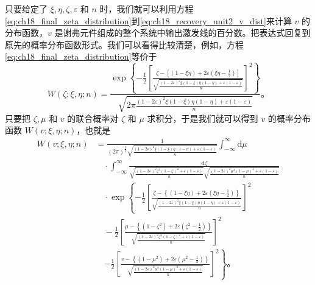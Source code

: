 只要给定了 $\xi,\eta,\zeta,\varepsilon$ 和 $n$ 时，我们就可以利用方程\eqref{eq:ch18_final_zeta_distribution}到\eqref{eq:ch18_recovery_unit2_v_dist}来计算 $v$ 的分布函数，$v$ 是谢弗元件组成的整个系统中输出激发线的百分数。把表达式回复到原先的概率分布函数形式。我们可以看得比较清楚，例如，方程\eqref{eq:ch18_final_zeta_distribution}等价于
\begin{equation*}
W(\zeta;\xi,\eta;n) = \frac{\exp\left\{-\frac{1}{2}\left[\frac{\zeta-\left[(1-\xi\eta)+2\varepsilon\left(\xi\eta-\frac{1}{2}\right)\right]}{\sqrt{\frac{(1-2\varepsilon)^2\xi(1-\xi)\eta(1-\eta)+\varepsilon(1-\varepsilon)}{n}}}\right]^2\right\}}{\sqrt{2\pi \frac{(1-2\varepsilon)^2\xi(1-\xi)\eta(1-\eta)+\varepsilon(1-\varepsilon)}{n}}}。
\end{equation*}
只要把 $\zeta,\mu$ 和 $v$ 的联合概率对 $\zeta$ 和 $\mu$ 求积分，于是我们就可以得到 $v$ 的概率分布函数 $W(v;\xi,\eta;n)$，也就是
\begin{equation}
\begin{aligned}
W(v;\xi,\eta;n) &= \frac{1}{(2\pi)^{\frac{3}{2}} \sqrt{\frac{(1-2\varepsilon)^2\xi(1-\xi)\eta(1-\eta)+\varepsilon(1-\varepsilon)}{n}}} \int_{-\infty}^{\infty} \mathrm{d}\mu \\
&\quad \cdot \int_{-\infty}^{\infty} \frac{\mathrm{d}\zeta}{\sqrt{\frac{(1-2\varepsilon)^2\zeta^2(1-\zeta)^2+\varepsilon(1-\varepsilon)}{n}} \sqrt{\frac{(1-2\varepsilon)^2\mu^2(1-\mu)^2+\varepsilon(1-\varepsilon)}{n}}} \\
&\quad \cdot \exp\left\{
-\frac{1}{2}\left[\frac{\zeta-\left\{(1-\xi\eta)+2\varepsilon\left(\xi\eta-\frac{1}{2}\right)\right\}}{\sqrt{\frac{(1-2\varepsilon)^2\xi(1-\xi)\eta(1-\eta)+\varepsilon(1-\varepsilon)}{n}}}\right]^2
\right. \\
&\quad -\frac{1}{2}\left[\frac{\mu-\left\{(1-\zeta^2)+2\varepsilon\left(\zeta^2-\frac{1}{2}\right)\right\}}{\sqrt{\frac{(1-2\varepsilon)^2\zeta^2(1-\zeta)^2+\varepsilon(1-\varepsilon)}{n}}}\right]^2 \\
&\quad \left. -\frac{1}{2}\left[\frac{v-\left\{(1-\mu^2)+2\varepsilon\left(\mu^2-\frac{1}{2}\right)\right\}}{\sqrt{\frac{(1-2\varepsilon)^2\mu^2(1-\mu)^2+\varepsilon(1-\varepsilon)}{n}}}\right]^2
\right\}。
\end{aligned}
\label{eq:ch18_full_system_v_joint_dist}
\end{equation}

